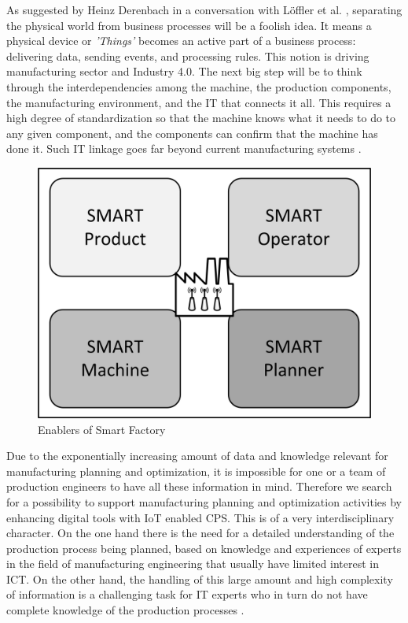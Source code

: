 {As suggested by Heinz Derenbach in a conversation with L{\"o}ffler et al. \cite{IOTMANU}, separating the physical world from business processes will be a foolish idea. It means a physical device or \textit{'Things'} becomes an active part of a business process: delivering data, sending events, and processing rules. This notion is driving manufacturing sector and Industry 4.0. The next big step will be to think through the interdependencies among the machine, the production components, the manufacturing environment, and the \acs{IT} that connects it all. This requires a high degree of standardization so that the machine knows what it needs to do to any given component, and the components can confirm that the machine has done it. Such \acs{IT} linkage goes far beyond current manufacturing systems \cite{IOTMANU}.
\begin{figure}[h!]
	\includegraphics[scale=0.6]{./gfx/smartfac}
	\centering
	\caption{Enablers of Smart Factory}
	\label{fig:2.10}
\end{figure}
Due to the exponentially increasing amount of data and knowledge relevant for manufacturing planning and optimization, it is impossible for one or a team of production engineers to have all these information in mind. Therefore we search for a possibility to support manufacturing planning and optimization activities by enhancing digital tools with \acs{IoT} enabled \acs{CPS}. This is of a very interdisciplinary character. On the one hand there is the need for a detailed understanding of the production process being planned, based on knowledge and experiences of experts in the field of manufacturing engineering that usually have limited interest in \acs{ICT}. On the other hand, the handling of this large amount and high complexity of information is a challenging task for \acs{IT} experts who in turn do not have complete knowledge of the production processes \cite{LANDHERR}. 

}
